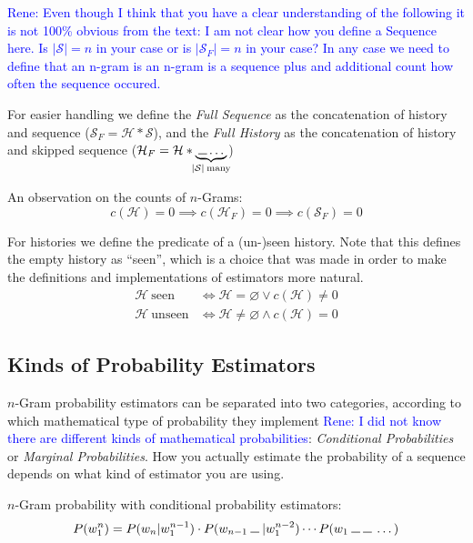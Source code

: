 \documentclass[11pt,a4paper]{article}
\newcommand{\Seq}{\mathcal{S}}
\newcommand{\Hist}{\mathcal{H}}
\newcommand{\SeqF}{\mathcal{S}_F}
\newcommand{\HistF}{\mathcal{H}_F}
\newcommand{\Skp}{\rule{7pt}{.5pt}}
\newcommand{\rp}[1]{\textcolor{blue}{Rene: #1}}
\begin{document}
  \rp{Even though I think that you have a clear understanding of the following
  it is not 100\% obvious from the text: I am not clear how you define a
  Sequence here. Is $|\Seq|=n$ in your case or is $|\SeqF|=n$ in your case?
  In any case we need to define that an n-gram is an n-gram is a sequence plus
  and additional count how often the sequence occured.}

  For easier handling we define the \emph{Full Sequence} as the concatenation
  of history and sequence ($\SeqF = \Hist * \Seq$), and the \emph{Full History}
  as the concatenation of history and skipped sequence
  ($\HistF = \Hist * \underbrace{\: \Skp \dotso \:}_{\mathclap{|\Seq| \: \text{many}}}$)

  An observation on the counts of $n$-Grams:
  \begin{equation}
    c(\Hist) = 0 \implies c(\HistF) = 0 \implies c(\SeqF) = 0
  \end{equation}

  For histories we define the predicate of a (un-)seen history. Note that this
  defines the empty history as ``seen'', which is a choice that was made in
  order to make the definitions and implementations of estimators more natural.
  \begin{equation}
    \begin{aligned}
      \Hist \: \mathrm{seen} &\iff \Hist = \varnothing \lor c(\Hist) \neq 0 \\
      \Hist \: \mathrm{unseen} &\iff \Hist \neq \varnothing \land c(\Hist) = 0
    \end{aligned}
  \end{equation}

  \subsection{Kinds of Probability Estimators}

  $n$-Gram probability estimators can be separated into two categories,
  according to which mathematical type of probability they implement
  \rp{I did not know there are different kinds of mathematical probabilities}:
  \emph{Conditional Probabilities} or \emph{Marginal Probabilities}. How you
  actually estimate the probability of a sequence depends on what kind of
  estimator you are using.

  $n$-Gram probability with conditional probability estimators:
  \begin{equation}
    P(w_1^n) = P(w_n | w_1^{n-1}) \cdot P(w_{n-1} \: \Skp \: | w_1^{n-2}) \dotsm P(w_1 \: \Skp \: \Skp \: \dotso)
  \end{equation}
\end{document}

